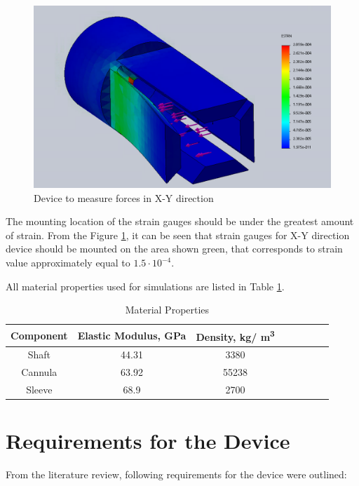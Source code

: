 \begin{figure}[h]
	\begin{center}
		\includegraphics[width=120mm]{fig/methods/old_sleeve.png}
	\end{center}
	\vspace{-4mm}
	\caption[X-Y device]
	{Device to measure forces in X-Y direction}
	\label{fig:XYdev}
	\vspace{-2mm}
\end{figure}

The mounting location of the strain gauges should be under the greatest amount of strain. From the Figure \ref{fig:XYdev}, it can be seen that strain gauges for X-Y direction device should be mounted on the area shown green, that corresponds to strain value approximately equal to $1.5 \cdot 10^{-4}$.

All material properties used for simulations are listed in Table \ref{tab:matProp}.
\begin{table}
\caption {Material Properties} \label{tab:matProp} 
\begin{center}
\begin{tabular}{ | c | c | c | c | c | c | c | c | } 
\hline
Component & Elastic Modulus, GPa & Density, kg/ m\textsuperscript{3} \\ 
\hline
Shaft & 44.31 & 3380\\ 
\hline
Cannula & 63.92 & 55238 \\ 
\hline
Sleeve & 68.9 & 2700  \\ 
\hline
\end{tabular}
\end{center}
\end{table}

\section{Requirements for the Device}
	\label{sec:DevReq}
	From the literature review, following requirements for the device were outlined:
	
